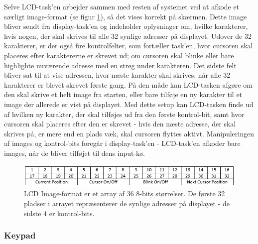 Selve LCD-task'en arbejder sammen med resten af systemet ved at afkode et særligt image-format (se figur \ref{fig:LCD_array}), så det vises korrekt på skærmen. Dette image bliver sendt fra display-task'en og indeholder oplysninger om, hvilke karakterer, hvis nogen, der skal skrives til alle 32 synlige adresser på displayet. Udover de 32 karakterer, er der også fire kontrolfelter, som fortæller task'en, hvor cursoren skal placeres efter karaktererne er skrevet ud; om cursoren skal blinke eller bare highlighte nuværende adresse med en streg under karakteren. Det sidste felt bliver sat til at vise adressen, hvor næste karakter skal skrives, når alle 32 karakterer er blevet skrevet første gang. På den måde kan LCD-tasken afgøre om den skal skrive et helt image fra starten, eller bare tilføje en ny karakter til et image der allerede er vist på displayet. Med dette setup kan LCD-tasken finde ud af hvilken ny karakter, der skal tilføjes ud fra den første kontrol-bit, samt hvor cursoren skal placeres efter den er skrevet - hvis den næste adresse, der skal skrives på, er mere end en plads væk, skal cursoren flyttes aktivt. Manipuleringen af images og kontrol-bits foregår i display-task'en - LCD-task'en afkoder bare images, når de bliver tilføjet til dens input-kø.


\begin{figure}[ht]
			\begin{center}
			\includegraphics[scale=0.9]{Billeder/LCD_Array.PNG}
			\end{center}
			\caption{LCD Image-format er et array af 36 8-bits størrelser. De første 32 pladser i arrayet repræsenterer de synlige adresser på displayet - de sidste 4 er kontrol-bits.}
			\label{fig:LCD_array}
\end{figure}

\subsubsection{Keypad}

